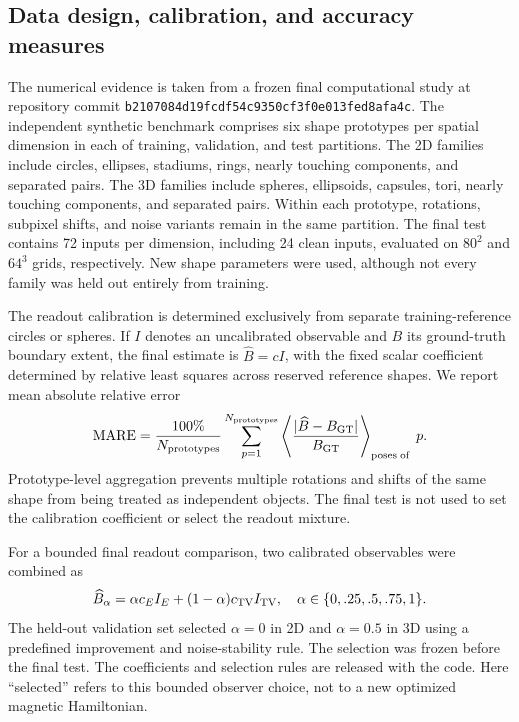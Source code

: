 \documentclass[11pt,a4paper]{article}
\newcommand{\gt}{\mathrm{GT}}
\newcommand{\MARE}{\mathrm{MARE}}
\begin{document}
\subsection{Data design, calibration, and accuracy measures}\label{subsec:impl:benchmark}
The numerical evidence is taken from a frozen final computational study at repository commit \texttt{b2107084d19fcdf54c9350cf3f0e013fed8afa4c}. The independent synthetic benchmark comprises six shape prototypes per spatial dimension in each of training, validation, and test partitions. The 2D families include circles, ellipses, stadiums, rings, nearly touching components, and separated pairs. The 3D families include spheres, ellipsoids, capsules, tori, nearly touching components, and separated pairs. Within each prototype, rotations, subpixel shifts, and noise variants remain in the same partition. The final test contains 72 inputs per dimension, including 24 clean inputs, evaluated on \(80^2\) and \(64^3\) grids, respectively. New shape parameters were used, although not every family was held out entirely from training.

The readout calibration is determined exclusively from separate training-reference circles or spheres. If \(I\) denotes an uncalibrated observable and \(B\) its ground-truth boundary extent, the final estimate is \(\widehat B=cI\), with the fixed scalar coefficient determined by relative least squares across reserved reference shapes. We report mean absolute relative error
\begin{equation}
 \MARE=\frac{100\%}{N_{\rm prototypes}}
 \sum_{p=1}^{N_{\rm prototypes}}\left\langle
 \frac{|\widehat B-B_{\gt}|}{B_{\gt}}
 \right\rangle_{\rm poses\;of\;}p.
 \label{eq:mare}
\end{equation}
Prototype-level aggregation prevents multiple rotations and shifts of the same shape from being treated as independent objects. The final test is not used to set the calibration coefficient or select the readout mixture.

For a bounded final readout comparison, two calibrated observables were combined as
\begin{equation}
 \widehat B_\alpha=\alpha c_E I_E+(1-\alpha)c_{\rm TV}I_{\rm TV},\quad
 \alpha\in\{0,.25,.5,.75,1\}.
 \label{eq:alpha}
\end{equation}
The held-out validation set selected \(\alpha=0\) in 2D and \(\alpha=0.5\) in 3D using a predefined improvement and noise-stability rule. The selection was frozen before the final test. The coefficients and selection rules are released with the code. Here ``selected'' refers to this bounded observer choice, not to a new optimized magnetic Hamiltonian.
\end{document}
